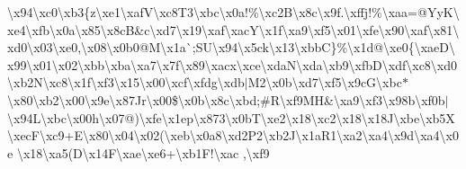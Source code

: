 \textbackslash{}x94\textbackslash{}xc0\textbackslash{}xb3\{z\textbackslash{}xe1\textbackslash{}xaf\+V\textbackslash{}xc8\+T3\textbackslash{}xbc\textbackslash{}x0a!\%\textbackslash{}xc2\+B\textbackslash{}x8c\textbackslash{}x9f.\textbackslash{}xffj!\%\textbackslash{}xaa=@\+Yy\+K\textbackslash{}xe4\textbackslash{}xfb\textbackslash{}x0a\textbackslash{}x85\textbackslash{}x8c\+B\&c\textbackslash{}xd7\textbackslash{}x19\textbackslash{}xaf\textbackslash{}xac\+Y\textbackslash{}x1f\textbackslash{}xa9\textbackslash{}xf5\textbackslash{}x01\textbackslash{}xfe\textbackslash{}x90\textbackslash{}xaf\textbackslash{}x81\textbackslash{}xd0\textbackslash{}x03\textbackslash{}xe0,\textbackslash{}x08\textbackslash{}x0b0@\+M\textbackslash{}x1a\`{};\+S\+U\textbackslash{}x94\textbackslash{}x5ck\textbackslash{}x13\textbackslash{}xbb\+C\}\%\textbackslash{}x1d@\textbackslash{}xe0\{\textbackslash{}xae\+D\textbackslash{}x99\textbackslash{}x01\textbackslash{}x02\textbackslash{}xbb\textbackslash{}xba\textbackslash{}xa7\textbackslash{}x7f\textbackslash{}x89\textbackslash{}xacx\textbackslash{}xce\textbackslash{}xda\+N\textbackslash{}xda\textbackslash{}xb9\textbackslash{}xfb\+D\textbackslash{}xdf\textbackslash{}xc8\textbackslash{}xd0\textbackslash{}xb2\+N\textbackslash{}xc8\textbackslash{}x1f\textbackslash{}xf3\textbackslash{}x15\textbackslash{}x00\textbackslash{}xcf\textbackslash{}xfdg\textbackslash{}xdb$\vert$\+M2\textbackslash{}x0b\textbackslash{}xd7\textbackslash{}xf5\textbackslash{}x9c\+G\textbackslash{}xbc$\ast$\textbackslash{}x80\textbackslash{}xb2\textbackslash{}x00\textbackslash{}x9e\textbackslash{}x87\+Jr\textbackslash{}x00\$\textbackslash{}x0b\textbackslash{}x8c\textbackslash{}xbd;\#\+R\textbackslash{}xf9\+M\+H\&\textbackslash{}xa9\textbackslash{}xf3\textbackslash{}x98b\textbackslash{}xf0b$\vert$\textbackslash{}x94\+L\textbackslash{}xbc\textbackslash{}x00h\textbackslash{}x07@)\textbackslash{}xfe\textbackslash{}x1ep\textbackslash{}x873\textbackslash{}x0b\+T\textbackslash{}xe2\textbackslash{}x18\textbackslash{}xc2\textbackslash{}x18\textbackslash{}x18\+J\textbackslash{}xbe\textbackslash{}xb5\+X\textbackslash{}xec\+F\textbackslash{}xc9+\+E\textbackslash{}x80\textbackslash{}x04\textbackslash{}x02(\textbackslash{}xeb\textbackslash{}x0a8\textbackslash{}xd2\+P2\textbackslash{}xb2\+J\textbackslash{}x1a\+R1\textbackslash{}xa2\textbackslash{}xa4\textbackslash{}x9d\textbackslash{}xa4\textbackslash{}x0e \textbackslash{}x18\textbackslash{}xa5(\+D\textbackslash{}x14\+F\textbackslash{}xae\textbackslash{}xe6+\textbackslash{}xb1\+F!\textbackslash{}xac ,\textbackslash{}xf9 